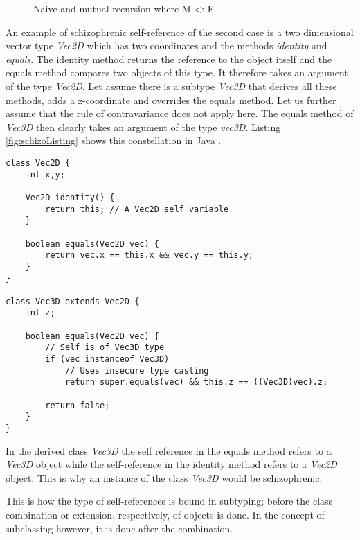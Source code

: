 \begin{figure}
	\centering
	\caption[Naive and mutual recursion where M <: F]{Naive and mutual recursion where M <: F \cite{cook_denotational_1989}}
	\label{fig:schizoRecursion}
\end{figure}

An example of schizophrenic self-reference of the second case is a two
dimensional vector type \emph{Vec2D} which has two coordinates and the
methods \emph{identity} and \emph{equals}. The identity method returns
the reference to the object itself and the equals method compares
two objects of this type. It therefore takes an argument of the type
\emph{Vec2D}. Let assume there is a subtype \emph{Vec3D} that derives all
these methods, adds a z-coordinate and overrides the equals method. Let us
further assume that the rule of contravariance does not apply here. The
equals method of \emph{Vec3D} then clearly takes an argument of the type
\emph{vec3D}. Listing \ref{fig:schizoListing} shows this constellation
in Java \cite{simons_theory_2003-2}.

\begin{lstlisting}[float=ht,caption={An example of schizophrenic self-reference},label={fig:schizoListing}]
class Vec2D {
	int x,y;

	Vec2D identity() {
		return this; // A Vec2D self variable
	}

	boolean equals(Vec2D vec) {
		return vec.x == this.x && vec.y == this.y;
	}
}

class Vec3D extends Vec2D {
	int z;

	boolean equals(Vec2D vec) {
		// Self is of Vec3D type
		if (vec instanceof Vec3D)
			// Uses insecure type casting
			return super.equals(vec) && this.z == ((Vec3D)vec).z;

		return false;
	}
}
\end{lstlisting}

In the derived class \emph{Vec3D} the self reference in the equals
method refers to a \emph{Vec3D} object while the self-reference in the identity method
refers to a \emph{Vec2D} object. This is why an instance of the class
\emph{Vec3D} would be schizophrenic.

This is how the type of self-references is bound in subtyping; before
the class combination or extension, respectively, of objects is done.
In the concept of subclassing however, it is done after the combination.


